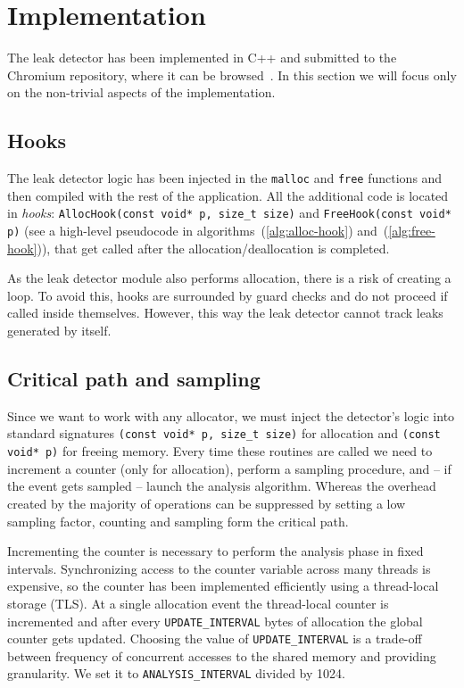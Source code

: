 \documentclass[preprint, numbers]{sigplanconf}
\begin{document}
\section{Implementation}
The leak detector has been implemented in C++ and submitted to the Chromium repository, where
it can be browsed~\cite{chromium-leak}.
In this section we will focus only on the non-trivial aspects of the implementation.

\subsection{Hooks}

The leak detector logic has been injected in the \texttt{malloc} and \texttt{free} functions
and then compiled with the rest of the application.
All the additional code is located in \textit{hooks}: \texttt{AllocHook(const void*~p, size\_t size)}
and \texttt{FreeHook(const void* p)}
(see a high-level pseudocode in algorithms~(\ref{alg:alloc-hook}) and~(\ref{alg:free-hook})),
that get called after the allocation/deallocation is completed.

As the leak detector module also performs allocation, there is a risk
of creating a loop.
To avoid this, hooks are surrounded by guard checks and do not proceed
if called inside themselves.
However, this way the leak detector cannot track leaks generated by itself.

\subsection{Critical path and sampling}

Since we want to work with any allocator, we must inject the detector's logic into
standard signatures \texttt{(const void* p, size\_t size)} for allocation and
\texttt{(const void* p)} for freeing memory.
Every time these routines are called we need to increment a counter (only for allocation),
perform a sampling procedure, and -- if the event gets sampled -- launch the analysis algorithm.
Whereas the overhead created by the majority of operations can be suppressed by setting a low
sampling factor, counting and sampling form the critical path.

Incrementing the counter is necessary to perform the analysis phase in fixed intervals.
Synchronizing access to the counter variable across many threads is expensive,
so the counter has been implemented efficiently using a thread-local storage (TLS).
At a single allocation event the thread-local counter is incremented and after every \texttt{UPDATE\_INTERVAL}
bytes of allocation the global counter gets updated.
Choosing the value of \texttt{UPDATE\_INTERVAL} is a trade-off between frequency of concurrent accesses
to the shared memory and providing granularity.
We set it to \texttt{ANALYSIS\_INTERVAL} divided by 1024.
\end{document}

